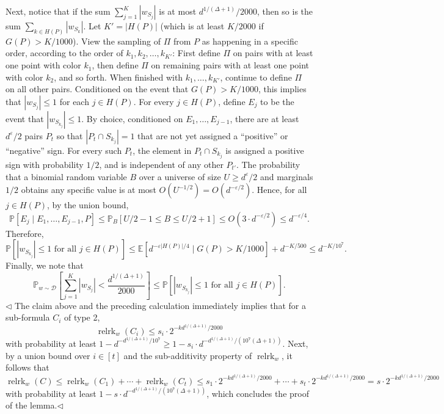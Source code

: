 Next, notice that if the sum $\sum_{j=1}^K|w_{S_j}|$ is at most $d^{1/(\Delta+1)}/2000$, then so is the sum $\sum_{k\in H(P)}|w_{S_k}|$. Let $K'=|H(P)|$ (which is at least $K/2000$ if $G(P)>K/1000$). View the sampling of $\Pi$ from $P$ as happening in a specific order, according to the order of $k_1,k_2,\ldots,k_{K'}$: First define $\Pi$ on pairs with at least one point with color $k_1$, then define $\Pi$ on remaining pairs with at least one point with color $k_2$, and so forth. When finished with $k_1,\ldots,k_{K'}$, continue to define $\Pi$ on all other pairs.
Conditioned on the event that $G(P)>K/1000$, this implies that $|w_{S_j}|\leq1$ for each $j\in H(P)$. For every $j\in H(P)$, define $E_j$ to be the event that $|w_{S_{k_j}}|\leq1$. By choice, conditioned on $E_1,\ldots,E_{j-1}$, there are at least $d^\varepsilon/2$ pairs $P_t$ so that $|P_t\cap S_{k_j}|=1$ that are not yet assigned a ``positive'' or ``negative'' sign. For every such $P_t$, the element in $P_t\cap S_{k_j}$ is assigned a positive sign with probability $1/2$, and is independent of any other $P_{t'}$. The probability that a binomial random variable $B$ over a universe of size $U\geq d^\varepsilon/2$ and marginals $1/2$ obtains any specific value is at most $O(U^{-1/2})=O(d^{-\varepsilon/2})$. Hence, for all $j\in H(P)$, by the union bound,
\[\mathbb P[E_j\mid E_1,\ldots,E_{j-1},P]\leq\mathbb P_B[U/2-1\leq B\leq U/2+1]\leq O(3\cdot d^{-\varepsilon/2})\leq d^{-\varepsilon/4}.\]
Therefore,
\[\mathbb P[|w_{S_{k_j}}|\leq1\text{ for all }j\in H(P)]\leq\mathbb E[d^{-\varepsilon|H(P)|/4}\mid G(P)>K/1000]+d^{-K/500}\leq d^{-K/10^7}.\]
Finally, we note that
\[\mathbb P_{w\sim\mathcal D}\left[\sum_{j=1}^K|w_{S_j}|<\frac{d^{1/(\Delta+1)}}{2000}\right]\leq\mathbb P[|w_{S_{k_j}}|\leq1\text{ for all }j\in H(P)].\]\hfill$\triangleleft$
The claim above and the preceding calculation immediately implies that for a sub-formula $C_i$ of type 2,
\[\operatorname{relrk}_w(C_i)\leq s_i\cdot2^{-kd^{1/(\Delta+1)}/2000}\]
with probability at least $1-d^{-d^{1/(\Delta+1)}/10^7}\geq1-s_i\cdot d^{-d^{1/(\Delta+1)}/(10^7(\Delta+1))}$.
Next, by a union bound over $i\in[t]$ and the sub-additivity property of $\operatorname{relrk}_w$, it follows that
\[\operatorname{relrk}_w(C)\leq\operatorname{relrk}_w(C_1)+\cdots+\operatorname{relrk}_w(C_t)\leq s_1\cdot2^{-kd^{1/(\Delta+1)}/2000}+\cdots+s_t\cdot2^{-kd^{1/(\Delta+1)}/2000}=s\cdot2^{-kd^{1/(\Delta+1)}/2000}\]
with probability at least $1-s\cdot d^{-d^{1/(\Delta+1)}/(10^7(\Delta+1))}$, which concludes the proof of the lemma.\hfill$\triangleleft$

